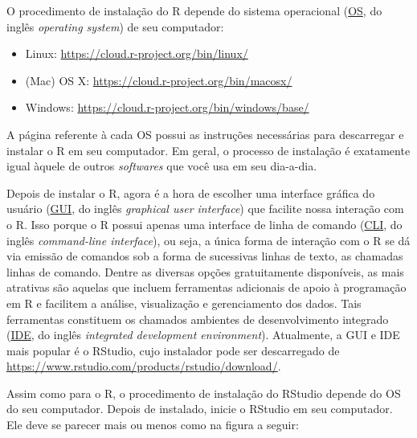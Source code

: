 \documentclass[]{book}
\providecommand{\tightlist}{%
  \setlength{\itemsep}{0pt}\setlength{\parskip}{0pt}}
\begin{document}
O procedimento de instalação do R depende do sistema operacional
(\href{https://en.wikipedia.org/wiki/Operating_system}{OS}, do inglês
\emph{operating system}) de seu computador:

\begin{itemize}
\tightlist
\item
  Linux: \url{https://cloud.r-project.org/bin/linux/}
\item
  (Mac) OS X: \url{https://cloud.r-project.org/bin/macosx/}
\item
  Windows: \url{https://cloud.r-project.org/bin/windows/base/}
\end{itemize}

A página referente à cada OS possui as instruções necessárias para
descarregar e instalar o R em seu computador. Em geral, o processo de
instalação é exatamente igual àquele de outros \emph{softwares} que você
usa em seu dia-a-dia.

Depois de instalar o R, agora é a hora de escolher uma interface gráfica
do usuário
(\href{https://en.wikipedia.org/wiki/Graphical_user_interface}{GUI}, do
inglês \emph{graphical user interface}) que facilite nossa interação com
o R. Isso porque o R possui apenas uma interface de linha de comando
(\href{https://en.wikipedia.org/wiki/Command-line_interface}{CLI}, do
inglês \emph{command-line interface}), ou seja, a única forma de
interação com o R se dá via emissão de comandos sob a forma de
sucessivas linhas de texto, as chamadas linhas de comando. Dentre as
diversas opções gratuitamente disponíveis, as mais atrativas são aquelas
que incluem ferramentas adicionais de apoio à programação em R e
facilitem a análise, visualização e gerenciamento dos dados. Tais
ferramentas constituem os chamados ambientes de desenvolvimento
integrado
(\href{https://en.wikipedia.org/wiki/Integrated_development_environment}{IDE},
do inglês \emph{integrated development environment}). Atualmente, a GUI
e IDE mais popular é o RStudio, cujo instalador pode ser descarregado de
\url{https://www.rstudio.com/products/rstudio/download/}.

Assim como para o R, o procedimento de instalação do RStudio depende do
OS do seu computador. Depois de instalado, inicie o RStudio em seu
computador. Ele deve se parecer mais ou menos como na figura a seguir:
\end{document}
